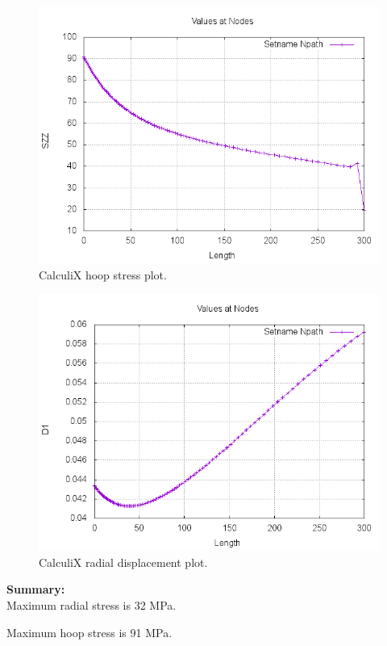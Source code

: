 \documentclass[12pt, a4paper, twoside]{article}
\begin{document}
\begin{figure}[h]
	\centering
	\includegraphics[scale=0.5]{graph_1}
	\caption{CalculiX hoop stress plot.}
	\label{fig:graph_1}
\end{figure}

\begin{figure}[h]
	\centering
	\includegraphics[scale=0.5]{graph_2}
	\caption{CalculiX radial displacement plot.}
	\label{fig:graph_2}
\end{figure}

\textbf{Summary:}\\

Maximum radial stress is 32 MPa.

Maximum hoop stress is 91 MPa.
\end{document}
